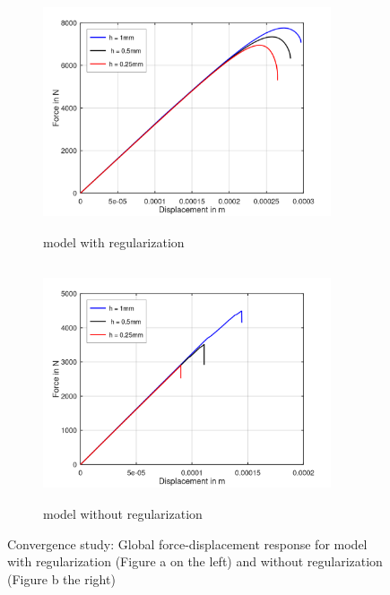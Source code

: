 \documentclass[12pt,a4paper,twoside,openright]{report}
\begin{document}
\begin{figure}[htbp!]
       \begin{subfigure}{0.45\textwidth}
         \includegraphics[width=8.5cm,height=7cm]{25.FvsD.png}
         \caption{model with regularization}
         \label{fig:with regularization}
     \end{subfigure}
     \hspace{1.5cm}
     \begin{subfigure}{0.45\textwidth}
         \includegraphics[width=8.5cm,height=7cm]{25.FvsD2.png}
         \caption{model without regularization}
         \label{fig:without regularization}
     \end{subfigure}
    \caption{Convergence study: Global force-displacement response for model with regularization (Figure a on the left) and without regularization (Figure b the right) }
    \label{fig:Convergence study}
\end{figure}
\FloatBarrier
 
\end{document}
